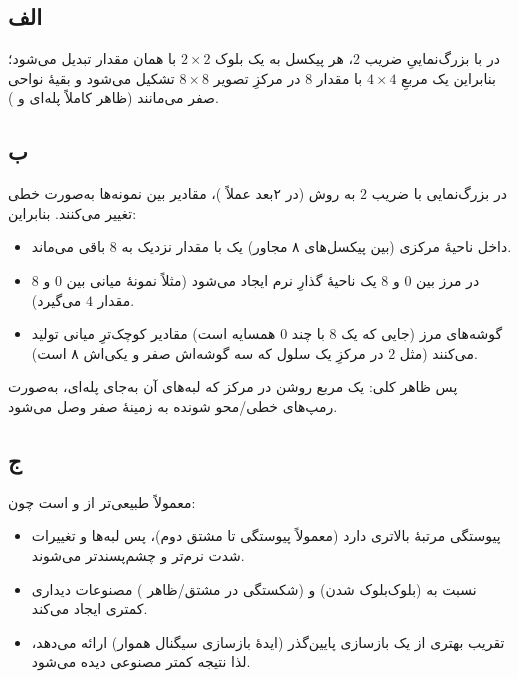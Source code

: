 \subsection*{الف}
در  با بزرگ‌نماییِ ضریب $2$، هر پیکسل به یک بلوک $2\times 2$ با همان مقدار تبدیل می‌شود؛ بنابراین یک مربعِ $4\times 4$ با مقدار $8$ در مرکزِ تصویر $8\times 8$ تشکیل می‌شود و بقیهٔ نواحی صفر می‌مانند (ظاهر کاملاً پله‌ای و ).

\begin{center}
\end{center}

\subsection*{ب}
در بزرگ‌نمایی با ضریب $2$ به روش  (در ۲بعد عملاً )، مقادیر بین نمونه‌ها به‌صورت خطی تغییر می‌کنند. بنابراین:
\begin{itemize}
    \item داخل ناحیهٔ مرکزی (بین پیکسل‌های ۸ مجاور) یک  با مقدار نزدیک به $8$ باقی می‌ماند.
    \item در مرز بین $0$ و $8$ یک ناحیهٔ گذارِ نرم ایجاد می‌شود (مثلاً نمونهٔ میانی بین $0$ و $8$ مقدار $4$ می‌گیرد).
    \item گوشه‌های مرز (جایی که یک $8$ با چند $0$ همسایه است) مقادیر کوچک‌ترِ میانی تولید می‌کنند (مثل $2$ در مرکزِ یک سلول که سه گوشه‌اش صفر و یکی‌اش ۸ است).
\end{itemize}
پس ظاهر کلی: یک مربع روشن در مرکز که لبه‌های آن به‌جای پله‌ای، به‌صورت رمپ‌های خطی/محو شونده به زمینهٔ صفر وصل می‌شود.

\subsection*{ج}
 معمولاً طبیعی‌تر از  و  است چون:
\begin{itemize}
    \item پیوستگی مرتبهٔ بالاتری دارد (معمولاً پیوستگی تا مشتق دوم)، پس لبه‌ها و تغییرات شدت نرم‌تر و چشم‌پسندتر می‌شوند.
    \item نسبت به  (بلوک‌بلوک شدن) و  (شکستگی در مشتق/ظاهر ) مصنوعات دیداری کمتری ایجاد می‌کند.
    \item تقریب بهتری از یک بازسازی پایین‌گذر (ایدهٔ بازسازی سیگنال هموار) ارائه می‌دهد، لذا نتیجه کمتر مصنوعی دیده می‌شود.
\end{itemize}

